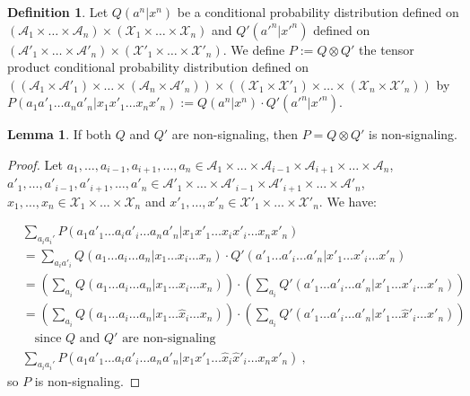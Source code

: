\documentclass[11pt]{article}
\theoremstyle{definition}
\newtheorem{lem}[theo]{Lemma}
\newtheorem{defi}[theo]{Definition}
\theoremstyle{remark}
\begin{document}
\begin{defi}
  Let $Q(a^n|x^n)$ be a conditional probability distribution defined on $\left(\mathcal{A}_1 \times \ldots \times \mathcal{A}_n\right) \times \left(\mathcal{X}_1 \times \ldots \times \mathcal{X}_n\right)$ and $Q'(a'^n|x'^n)$ defined on $\left(\mathcal{A}'_1 \times \ldots \times \mathcal{A}'_n\right) \times \left(\mathcal{X}'_1 \times \ldots \times \mathcal{X}'_n\right)$. We define $P := Q \otimes Q'$ the tensor product conditional probability distribution defined on $\left(\left(\mathcal{A}_1 \times \mathcal{A}'_1\right) \times \ldots \times \left(\mathcal{A}_n \times \mathcal{A}'_n\right) \right) \times \left(\left(\mathcal{X}_1 \times \mathcal{X}'_1\right) \times \ldots \times \left(\mathcal{X}_n \times \mathcal{X}'_n\right) \right) $ by $P(a_1a'_1\ldots a_na'_n|x_1x'_1\ldots x_nx'_n) := Q(a^n|x^n) \cdot Q'(a'^n|x'^n)$.
\end{defi}

\begin{lem}
  \label{lem:NStensor}
  If both $Q$ and $Q'$ are non-signaling, then $P = Q \otimes Q'$ is non-signaling.
\end{lem}
\begin{proof}
  Let $a_1, \ldots, a_{i-1}, a_{i+1}, \ldots, a_n \in \mathcal{A}_1 \times \ldots \times \mathcal{A}_{i-1} \times \mathcal{A}_{i+1} \times \ldots \times \mathcal{A}_n$, $a'_1, \ldots, a'_{i-1}, a'_{i+1}, \ldots, a'_n \in \mathcal{A}'_1 \times \ldots \times \mathcal{A}'_{i-1} \times \mathcal{A}'_{i+1} \times \ldots \times \mathcal{A}'_n$, $x_1, \ldots, x_n \in \mathcal{X}_1 \times \ldots \times \mathcal{X}_n$ and $x'_1, \ldots, x'_n \in \mathcal{X}'_1 \times \ldots \times \mathcal{X}'_n$. We have:

  \begin{equation}
    \begin{aligned}
      &\sum_{a_ia_i'}P(a_1a'_1\ldots a_ia'_i \ldots a_na'_n|x_1x'_1\ldots x_ix'_i \ldots x_nx'_n)\\
      &= \sum_{a_ia'_i}  Q(a_1\ldots a_i \ldots a_n|x_1\ldots x_i \ldots x_n) \cdot Q'(a'_1\ldots a'_i \ldots a'_n|x'_1\ldots x'_i \ldots x'_n)\\
      &= \left(\sum_{a_i}  Q(a_1\ldots a_i \ldots a_n|x_1\ldots x_i \ldots x_n)\right) \cdot \left(\sum_{a_i}  Q'(a'_1\ldots a'_i \ldots a'_n|x'_1\ldots x'_i \ldots x'_n)\right)\\
      &= \left(\sum_{a_i}  Q(a_1\ldots a_i \ldots a_n|x_1\ldots \hat{x}_i \ldots x_n)\right) \cdot \left(\sum_{a_i}  Q'(a'_1\ldots a'_i \ldots a'_n|x'_1\ldots \hat{x}'_i \ldots x'_n)\right)\\
      &\quad \text{since $Q$ and $Q'$ are non-signaling} \\
      &\sum_{a_ia_i'}P(a_1a'_1\ldots a_ia'_i \ldots a_na'_n|x_1x'_1\ldots \hat{x}_i\hat{x}'_i \ldots x_nx'_n) \ ,
    \end{aligned}
  \end{equation}
  so $P$ is non-signaling.
\end{proof}
\end{document}
